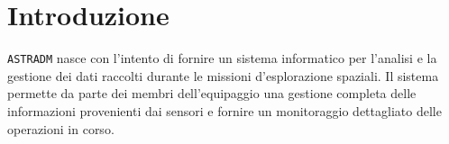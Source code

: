 \chapter{Introduzione}
\texttt{ASTRADM} nasce con l'intento di fornire un sistema informatico per l'analisi e la gestione dei dati raccolti durante le missioni d'esplorazione spaziali.
Il sistema permette da parte dei membri dell'equipaggio una gestione completa delle informazioni provenienti dai sensori e fornire un monitoraggio dettagliato delle operazioni in corso. 





